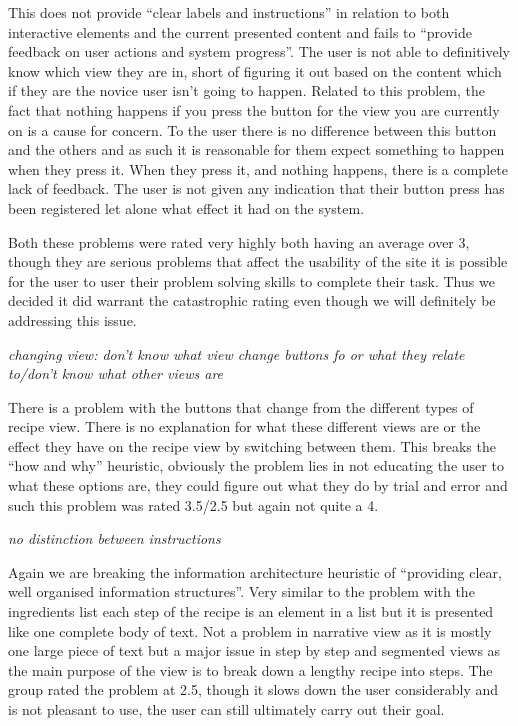 This does not provide “clear labels and instructions” in relation to both interactive elements and the current presented content and fails to “provide feedback on user actions and system progress”. The user is not able to definitively know which view they are in, short of figuring it out based on the content which if they are the novice user isn’t going to happen. Related to this problem, the fact that nothing happens if you press the button for the view you are currently on is a cause for concern. To the user there is no difference between this button and the others and as such it is reasonable for them expect something to happen when they press it. When they press it, and nothing happens, there is a complete lack of feedback. The user is not given any indication that their button press has been registered let alone what effect it had on the system. 

Both these problems were rated very highly both having an average over 3, though they are serious problems that affect the usability of the site it is possible for the user to user their problem solving skills to complete their task. Thus we decided it did warrant the catastrophic rating even though we will definitely be addressing this issue.

\begin{center}
\emph{changing view: don't know what view change buttons fo or what they relate to/don't know what other views are}
\end{center}
There is a problem with the buttons that change from the different types of recipe view. There is no explanation for what these different views are or the effect they have on the recipe view by switching between them. This breaks the “how and why” heuristic, obviously the problem lies in not educating the user to what these options are, they could figure out what they do by trial and error and such this problem was rated 3.5/2.5 but again not quite a 4. 

\begin{center}
\emph{no distinction between instructions}
\end{center}
Again we are breaking the information architecture heuristic of “providing clear, well organised information structures”. Very similar to the problem with the ingredients list each step of the recipe is an element in a list but it is presented like one complete body of text. Not a problem in narrative view as it is mostly one large piece of text but a major issue in step by step and segmented views as the main purpose of the view is to break down a lengthy recipe into steps. The group rated the problem at 2.5, though it slows down the user considerably and is not pleasant to use, the user can still ultimately carry out their goal.

